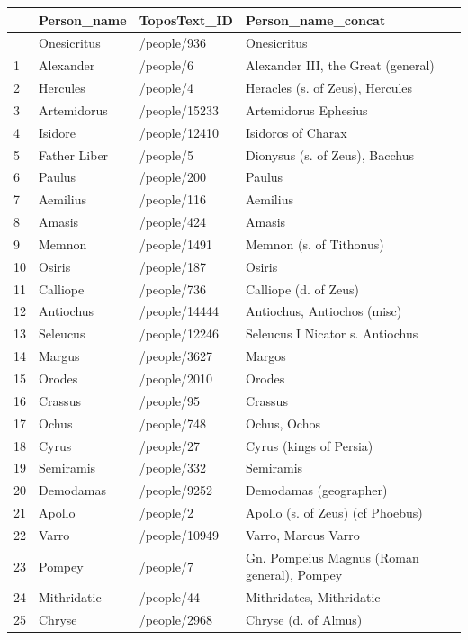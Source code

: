 \documentclass[
  12pt,
]{article}
\begin{document}
\begin{longtable}[]{@{}llll@{}}
\toprule\noalign{}
& Person\_name & ToposText\_ID & Person\_name\_concat \\
\midrule\noalign{}
\endhead
\bottomrule\noalign{}
\endlastfoot
0 & Onesicritus & /people/936 & Onesicritus \\
1 & Alexander & /people/6 & Alexander III, the Great (general) \\
2 & Hercules & /people/4 & Heracles (s. of Zeus), Hercules \\
3 & Artemidorus & /people/15233 & Artemidorus Ephesius \\
4 & Isidore & /people/12410 & Isidoros of Charax \\
5 & Father Liber & /people/5 & Dionysus (s. of Zeus), Bacchus \\
6 & Paulus & /people/200 & Paulus \\
7 & Aemilius & /people/116 & Aemilius \\
8 & Amasis & /people/424 & Amasis \\
9 & Memnon & /people/1491 & Memnon (s. of Tithonus) \\
10 & Osiris & /people/187 & Osiris \\
11 & Calliope & /people/736 & Calliope (d. of Zeus) \\
12 & Antiochus & /people/14444 & Antiochus, Antiochos (misc) \\
13 & Seleucus & /people/12246 & Seleucus I Nicator s. Antiochus \\
14 & Margus & /people/3627 & Margos \\
15 & Orodes & /people/2010 & Orodes \\
16 & Crassus & /people/95 & Crassus \\
17 & Ochus & /people/748 & Ochus, Ochos \\
18 & Cyrus & /people/27 & Cyrus (kings of Persia) \\
19 & Semiramis & /people/332 & Semiramis \\
20 & Demodamas & /people/9252 & Demodamas (geographer) \\
21 & Apollo & /people/2 & Apollo (s. of Zeus) (cf Phoebus) \\
22 & Varro & /people/10949 & Varro, Marcus Varro \\
23 & Pompey & /people/7 & Gn. Pompeius Magnus (Roman general), Pompey \\
24 & Mithridatic & /people/44 & Mithridates, Mithridatic \\
25 & Chryse & /people/2968 & Chryse (d. of Almus) \\

\end{longtable}
\end{document}
